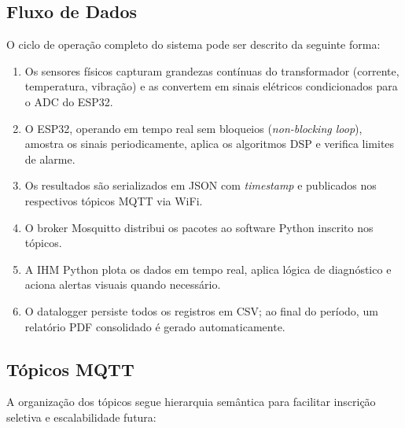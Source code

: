 \documentclass[12pt, a4paper]{article}
\begin{document}
\subsection{Fluxo de Dados}

O ciclo de operação completo do sistema pode ser descrito da seguinte forma:

\begin{enumerate}[leftmargin=2cm]
    \item Os sensores físicos capturam grandezas contínuas do transformador (corrente, temperatura, vibração) e as convertem em sinais elétricos condicionados para o ADC do ESP32.
    \item O ESP32, operando em tempo real sem bloqueios (\textit{non-blocking loop}), amostra os sinais periodicamente, aplica os algoritmos DSP e verifica limites de alarme.
    \item Os resultados são serializados em JSON com \textit{timestamp} e publicados nos respectivos tópicos MQTT via WiFi.
    \item O broker Mosquitto distribui os pacotes ao software Python inscrito nos tópicos.
    \item A IHM Python plota os dados em tempo real, aplica lógica de diagnóstico e aciona alertas visuais quando necessário.
    \item O datalogger persiste todos os registros em CSV; ao final do período, um relatório PDF consolidado é gerado automaticamente.
\end{enumerate}

\subsection{Tópicos MQTT}

A organização dos tópicos segue hierarquia semântica para facilitar inscrição seletiva e escalabilidade futura:
\end{document}
